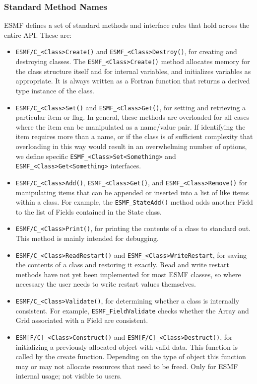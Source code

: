 \subsubsection{Standard Method Names}

ESMF defines a set of standard methods and interface rules that
hold across the entire API.  These are: 

\begin{itemize}

\item {\tt ESMF/C\_<Class>Create()} and {\tt ESMF\_<Class>Destroy()}, for creating and 
destroying classes.  The {\tt ESMF\_<Class>Create()} method allocates 
memory for the class structure itself and for internal variables, and
initializes variables as appropriate.  It is always written as a 
Fortran function that returns a derived type instance of the class.

\item {\tt ESMF/C\_<Class>Set()} and {\tt ESMF\_<Class>Get()}, for setting 
and retrieving a particular item or flag.  In general, these methods are
overloaded for all cases where the item can be manipulated as a
name/value pair.  If identifying the item requires more than a 
name, or if the class is of sufficient complexity that overloading
in this way would result in an overwhelming number of options, we 
define specific {\tt ESMF\_<Class>Set<Something>} and 
{\tt ESMF\_<Class>Get<Something>} interfaces.

\item {\tt ESMF/C\_<Class>Add()}, {\tt ESMF\_<Class>Get()}, and 
{\tt ESMF\_<Class>Remove()} for manipulating 
items that can be appended or inserted into a list of like
items within a class.  For example, the {\tt ESMF\_StateAdd()}
method adds another Field to the list of Fields contained
in the State class.

\item {\tt ESMF/C\_<Class>Print()}, for printing the contents of a class to 
standard out.  This method is mainly intended for debugging.

\item {\tt ESMF/C\_<Class>ReadRestart()} and {\tt ESMF\_<Class>WriteRestart}, 
for saving the contents of a class and restoring it exactly.  Read
and write restart methods have not yet been implemented for most
ESMF classes, so where necessary the user needs to write restart 
values themselves.

\item {\tt ESMF/C\_<Class>Validate()}, for determining whether a class is 
internally consistent.  For example, {\tt ESMF\_FieldValidate} checks 
whether the Array and Grid associated with a Field are consistent.
  
\item{\tt ESM[F/C]\_<Class>Construct()} and {\tt ESM[F/C]\_<Class>Destruct()},
for initializing a previously allocated object with valid data.  This 
function is called by the create function.  Depending on the type of 
object this function may or may not allocate resources that need to be freed.  
Only for ESMF internal usage; not visible to users.

\end{itemize}

